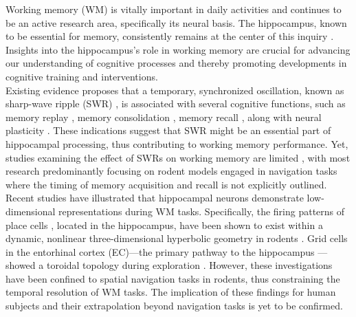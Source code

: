 \documentclass[final,3p,times,twocolumn]{elsarticle}
\begin{document}
Working memory (WM) is vitally important in daily activities and continues to be an active research area, specifically its neural basis. The hippocampus, known to be essential for memory, consistently remains at the center of this inquiry \cite{scoville_loss_1957} \cite{squire_legacy_2009}  \cite{boran_persistent_2019} \cite{kaminski_persistently_2017} \cite{kornblith_persistent_2017} \cite{faraut_dataset_2018} \cite{borders_hippocampus_2022} \cite{li_functional_2023} \cite{dimakopoulos_information_2022}. Insights into the hippocampus's role in working memory are crucial for advancing our understanding of cognitive processes and thereby promoting developments in cognitive training and interventions.
\\
\indent
Existing evidence proposes that a temporary, synchronized oscillation, known as sharp-wave ripple (SWR) \cite{buzsaki_hippocampal_2015}, is associated with several cognitive functions, such as memory replay \cite{wilson_reactivation_1994} \cite{nadasdy_replay_1999} \cite{lee_memory_2002} \cite{diba_forward_2007} \cite{davidson_hippocampal_2009}, memory consolidation \cite{girardeau_selective_2009} \cite{ego-stengel_disruption_2010} \cite{fernandez-ruiz_long-duration_2019} \cite{kim_corticalhippocampal_2022}, memory recall \cite{wu_hippocampal_2017} \cite{norman_hippocampal_2019} \cite{norman_hippocampal_2021}, along with neural plasticity \cite{behrens_induction_2005} \cite{norimoto_hippocampal_2018}. These indications suggest that SWR might be an essential part of hippocampal processing, thus contributing to working memory performance. Yet, studies examining the effect of SWRs on working memory are limited \cite{jadhav_awake_2012}, with most research predominantly focusing on rodent models engaged in navigation tasks where the timing of memory acquisition and recall is not explicitly outlined.
\\
\indent
Recent studies have illustrated that hippocampal neurons demonstrate low-dimensional representations during WM tasks. Specifically, the firing patterns of place cells \cite{okeefe_hippocampus_1971} \cite{okeefe_place_1976} \cite{ekstrom_cellular_2003} \cite{kjelstrup_finite_2008} \cite{harvey_intracellular_2009}, located in the hippocampus, have been shown to exist within a dynamic, nonlinear three-dimensional hyperbolic geometry in rodents \cite{zhang_hippocampal_2022}. Grid cells in the entorhinal cortex (EC)—the primary pathway to the hippocampus \cite{naber_reciprocal_2001} \cite{van_strien_anatomy_2009} \cite{strange_functional_2014}—showed a toroidal topology during exploration \cite{gardner_toroidal_2022}. However, these investigations have been confined to spatial navigation tasks in rodents, thus constraining the temporal resolution of WM tasks. The implication of these findings for human subjects and their extrapolation beyond navigation tasks is yet to be confirmed.
\end{document}
